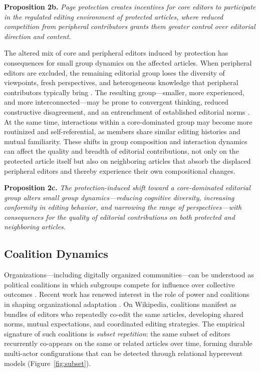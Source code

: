 \documentclass[11pt]{article}
\begin{document}
\smallskip
\noindent\textbf{Proposition 2b.} \emph{Page protection creates incentives for core editors to participate in the regulated editing environment of protected articles, where reduced competition from peripheral contributors grants them greater control over editorial direction and content.}

\smallskip
The altered mix of core and peripheral editors induced by protection has consequences for small group dynamics on the affected articles. When peripheral editors are excluded, the remaining editorial group loses the diversity of viewpoints, fresh perspectives, and heterogeneous knowledge that peripheral contributors typically bring \citep{Cattani2014}. The resulting group---smaller, more experienced, and more interconnected---may be prone to convergent thinking, reduced constructive disagreement, and an entrenchment of established editorial norms \citep{Klapper2024}. At the same time, interactions within a core-dominated group may become more routinized and self-referential, as members share similar editing histories and mutual familiarity. These shifts in group composition and interaction dynamics can affect the quality and breadth of editorial contributions, not only on the protected article itself but also on neighboring articles that absorb the displaced peripheral editors and thereby experience their own compositional changes.

\smallskip
\noindent\textbf{Proposition 2c.} \emph{The protection-induced shift toward a core-dominated editorial group alters small group dynamics---reducing cognitive diversity, increasing conformity in editing behavior, and narrowing the range of perspectives---with consequences for the quality of editorial contributions on both protected and neighboring articles.}

\subsection{Coalition Dynamics}

Organizations---including digitally organized communities---can be understood as political coalitions in which subgroups compete for influence over collective outcomes \citep{March1962, Stevenson1985}. Recent work has renewed interest in the role of power and coalitions in shaping organizational adaptation \citep{Levinthal2024, MithaniOBrien2020}. On Wikipedia, coalitions manifest as bundles of editors who repeatedly co-edit the same articles, developing shared norms, mutual expectations, and coordinated editing strategies. The empirical signature of such coalitions is \emph{subset repetition}: the same subset of editors recurrently co-appears on the same or related articles over time, forming durable multi-actor configurations that can be detected through relational hyperevent models (Figure~\ref{fig:subset}).
\end{document}

